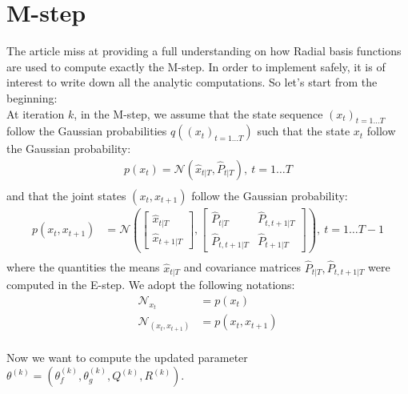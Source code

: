 \section{M-step}

The article miss at providing a full understanding on how Radial basis functions are used to compute exactly the M-step. In order to implement safely, it is of interest to write down all the analytic computations. So let's start from the beginning:\\

At iteration $k$, in the M-step, we assume that the state sequence $(x_t)_{t=1 \ldots T}$ follow the Gaussian probabilities $q \left( (x_t)_{t=1 \ldots T} \right)$ such that the state $x_t$ follow the Gaussian probability:
\begin{align*}
  p(x_t) = \mathcal{N}\left( \hat{x}_{t|T}, \hat{P}_{t|T} \right), \  t=1 \ldots T\\
\end{align*}
and that the joint states $(x_t, x_{t+1})$ follow the Gaussian probability:
\begin{align*}
  p(x_t, x_{t+1}) &=
  \mathcal{N}
    \left(
      \left[
        \begin{array}{c} \hat{x}_{t|T} \\ \hat{x}_{t+1|T} \end{array}
      \right],
      \left[
        \begin{array}{cc} \hat{P}_{t|T} & \hat{P}_{t,t+1|T}\\ \hat{P}_{t,t+1|T} & \hat{P}_{t+1|T} \end{array}
      \right]
    \right), \  t=1 \ldots T-1\\
\end{align*}
where the quantities the means $\hat{x}_{t|T}$ and covariance matrices $\hat{P}_{t|T}, \hat{P}_{t,t+1|T}$ were computed in the E-step.
We adopt the following notations:
\begin{align*}
  \mathcal{N}_{x_t} &= p(x_t)\\
  \mathcal{N}_{(x_t,x_{t+1})} &= p(x_t, x_{t+1})\\
\end{align*}

Now we want to compute the updated parameter $\theta^{(k)} = \left( \theta_f^{(k)}, \theta_g^{(k)}, Q^{(k)}, R^{(k)} \right)$.

